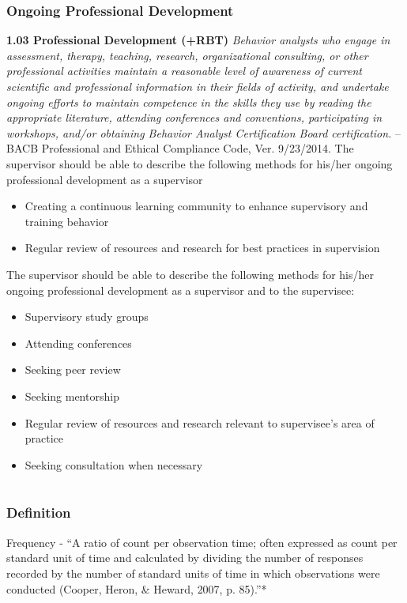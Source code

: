 \subsection{Ongoing Professional Development}
\textbf{1.03 Professional Development (+RBT)}
\textit{Behavior analysts who engage in assessment, therapy, teaching, research, organizational consulting, or other professional activities maintain a reasonable level of awareness of current scientific and professional information in their fields of activity, and undertake ongoing efforts to maintain competence in the skills they use by reading the appropriate literature, attending conferences and conventions, participating in workshops, and/or obtaining Behavior Analyst Certification Board certification.}
--BACB Professional and Ethical Compliance Code, Ver. 9/23/2014.
%
The supervisor should be able to describe the following methods for his/her ongoing professional development as a supervisor
\begin{itemize}
\item Creating a continuous learning community to enhance supervisory and training behavior
\item Regular review of resources and research for best practices in supervision
\end{itemize}
%
The supervisor should be able to describe the following methods for his/her ongoing professional development as a supervisor and to the supervisee:
\begin{itemize}
\item Supervisory study groups
\item Attending conferences
\item Seeking peer review
\item Seeking mentorship
\item Regular review of resources and research relevant to supervisee's area of practice
\item Seeking consultation when necessary
\end{itemize}
%
%
%
%
%
%
%
%
%
%
%
%
%
%
%
%
%
%
%
%
%
%
%
%
%
%
%
%
%
%
% 
\chapter{\fourseca{}}
%
\section{\fouraOne{}}
\subsection{Definition}
Frequency - ``A ratio of count per observation time; often expressed as count per standard unit of time and calculated by dividing the number of responses recorded by the number of standard units of time in which observations were conducted (Cooper, Heron, \& Heward, 2007, p. 85).''*
%

